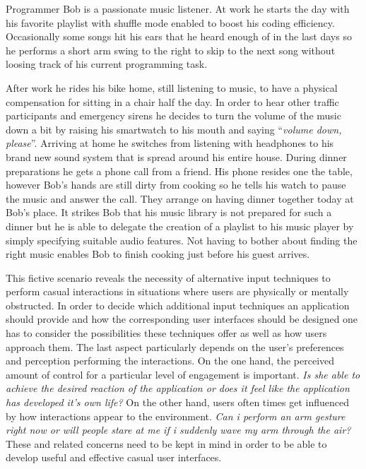 \begin{addmargin}[1cm]{1cm}
Programmer Bob is a passionate music listener. At work he starts the day with his favorite playlist with shuffle mode enabled to boost his coding efficiency. Occasionally some songs hit his ears that he heard enough of in the last days so he performs a short arm swing to the right to skip to the next song without loosing track of his current programming task. 

After work he rides his bike home, still listening to music, to have a physical compensation for sitting in a chair half the day. In order to hear other traffic participants and emergency sirens he decides to turn the volume of the music down a bit by raising his smartwatch to his mouth and saying ``\textit{volume down, please}''. Arriving at home he switches from listening with headphones to his brand new sound system that is spread around his entire house. During dinner preparations he gets a phone call from a friend. His phone resides one the table, however Bob's hands are still dirty from cooking so he tells his watch to pause the music and answer the call. They arrange on having dinner together today at Bob's place. It strikes Bob that his music library is not prepared for such a dinner but he is able to delegate the creation of a playlist to his music player by simply specifying suitable audio features. Not having to bother about finding the right music enables Bob to finish cooking just before his guest arrives.\\
\end{addmargin}

This fictive scenario reveals the necessity of alternative input techniques to perform casual interactions in situations where users are physically or mentally obstructed. In order to decide which additional input techniques an application should provide and how the corresponding user interfaces should be designed one has to consider the possibilities these techniques offer as well as how users approach them. The last aspect particularly depends on the user's preferences and perception performing the interactions. On the one hand, the perceived amount of control for a particular level of engagement is important. \textit{Is she able to achieve the desired reaction of the application or does it feel like the application has developed it's own life?}
On the other hand, users often times get influenced by how interactions appear to the environment. \textit{Can i perform an arm gesture right now or will people stare at me if i suddenly wave my arm through the air?}
These and related concerns need to be kept in mind in order to be able to develop useful and effective casual user interfaces.

